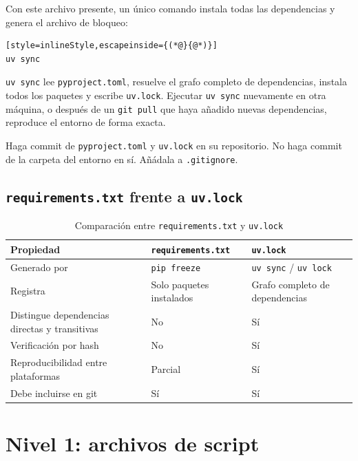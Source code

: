 Con este archivo presente, un único comando instala todas las dependencias
y genera el archivo de bloqueo:

\begin{lstlisting}[style=inlineStyle,escapeinside={(*@}{@*)}]
uv sync
\end{lstlisting}

\texttt{uv sync} lee \texttt{pyproject.toml}, resuelve el grafo completo de
dependencias, instala todos los paquetes y escribe \texttt{uv.lock}.
Ejecutar \texttt{uv sync} nuevamente en otra máquina, o después de un
\texttt{git pull} que haya añadido nuevas dependencias, reproduce el
entorno de forma exacta.

\begin{infobox}
Haga commit de \texttt{pyproject.toml} y \texttt{uv.lock} en su repositorio.
No haga commit de la carpeta del entorno en sí. Añádala a
\texttt{.gitignore}.
\end{infobox}

\newpage
\subsection{\texttt{requirements.txt} frente a \texttt{uv.lock}}

\begin{table}[h]
\centering
\caption{Comparación entre \texttt{requirements.txt} y \texttt{uv.lock}}
\label{tab:req-vs-lock}
\begin{tabular}{@{}p{}p{}p{}@{}}
\toprule
\textbf{Propiedad} & \textbf{\texttt{requirements.txt}} & \textbf{\texttt{uv.lock}} \\
\midrule
Generado por
  & \texttt{pip freeze}
  & \texttt{uv sync} / \texttt{uv lock} \\[4pt]
Registra
  & Solo paquetes instalados
  & Grafo completo de dependencias \\[4pt]
Distingue dependencias directas y transitivas
  & No
  & Sí \\[4pt]
Verificación por hash
  & No
  & Sí \\[4pt]
Reproducibilidad entre plataformas
  & Parcial
  & Sí \\[4pt]
Debe incluirse en git
  & Sí
  & Sí \\
\bottomrule
\end{tabular}
\end{table}

\section{Nivel 1: archivos de script}
\label{sec:level1}

